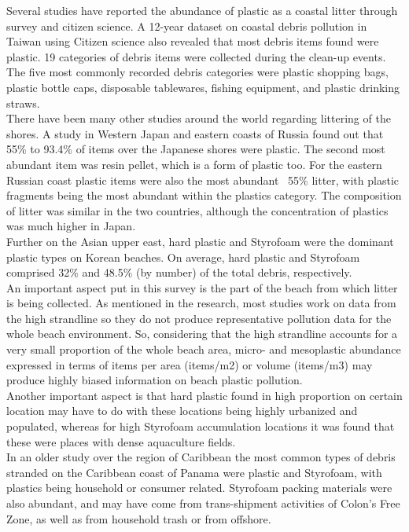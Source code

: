 \documentclass[10pt]{article}\usepackage[]{graphicx}\usepackage[]{color}
\begin{document}
Several studies have reported the abundance of plastic as a coastal litter through survey and citizen science. A 12-year dataset on coastal debris pollution in Taiwan using Citizen science also revealed that most debris items found were plastic. \cite{WALTHER2018} 19 categories of debris items were collected during the clean-up events. The five most commonly recorded debris categories were plastic shopping bags, plastic bottle caps, disposable tablewares, fishing equipment, and plastic drinking straws. \\

There have been many other studies around the world regarding littering of the shores. A study in Western Japan and eastern coasts of Russia found out that 55\% to 93.4\% of items over the Japanese shores were plastic. The second most abundant item was resin pellet, which is a form of plastic too. For the eastern Russian coast plastic items were also the most abundant ~55\% litter, with plastic fragments being the most abundant within the plastics category. The composition of litter was similar in the two countries, although the concentration of plastics was much higher in Japan. \cite{KUSUI2003} \\

Further on the Asian upper east, hard plastic and Styrofoam were the dominant plastic types on Korean beaches. On average, hard plastic and Styrofoam comprised 32\% and 48.5\% (by number) of the total debris, respectively. \\
An important aspect put in this survey is the part of the beach from which litter is being collected. As mentioned in the research, most studies work on data from the high strandline so they do not produce representative pollution data for the whole beach environment.  So, considering that the high strandline accounts for a very small proportion of the whole beach area, micro- and mesoplastic abundance expressed in terms of items per area (items/m2) or volume (items/m3) may produce highly biased information on beach plastic pollution.\\
Another important aspect is that hard plastic found in high proportion on certain location may have to do with these locations being highly urbanized and populated, whereas for high Styrofoam accumulation locations it was found that these were places with dense aquaculture fields.
\cite{LEE2017} \\

In an older study over the region of Caribbean the most common types of debris stranded on the Caribbean coast of Panama were plastic and Styrofoam, with plastics being household or consumer related. Styrofoam packing materials were also abundant, and may have come from trans-shipment activities of Colon's Free Zone, as well as from household trash or from offshore. \cite{ GARRITY1993} \\
\end{document}
